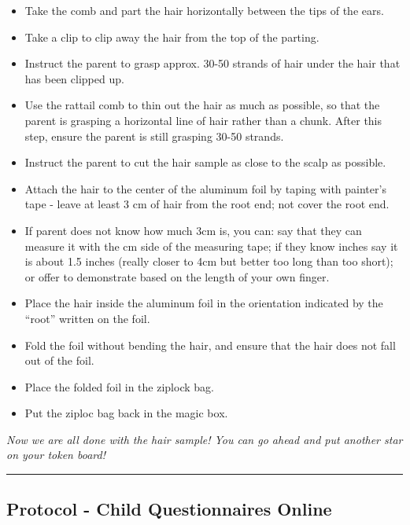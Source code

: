 \documentclass[]{book}
\providecommand{\tightlist}{%
  \setlength{\itemsep}{0pt}\setlength{\parskip}{0pt}}
\begin{document}
\begin{itemize}
\tightlist
\item
  Take the comb and part the hair horizontally between the tips of the ears.
\item
  Take a clip to clip away the hair from the top of the parting.
\item
  Instruct the parent to grasp approx. 30-50 strands of hair under the hair that has been clipped up.
\item
  Use the rattail comb to thin out the hair as much as possible, so that the parent is grasping a horizontal line of hair rather than a chunk. After this step, ensure the parent is still grasping 30-50 strands.
\item
  Instruct the parent to cut the hair sample as close to the scalp as possible.
\item
  Attach the hair to the center of the aluminum foil by taping with painter's tape - leave at least 3 cm of hair from the root end; not cover the root end.
\item
  If parent does not know how much 3cm is, you can: say that they can measure it with the cm side of the measuring tape; if they know inches say it is about 1.5 inches (really closer to 4cm but better too long than too short); or offer to demonstrate based on the length of your own finger.
\item
  Place the hair inside the aluminum foil in the orientation indicated by the ``root'' written on the foil.
\item
  Fold the foil without bending the hair, and ensure that the hair does not fall out of the foil.
\item
  Place the folded foil in the ziplock bag.
\item
  Put the ziploc bag back in the magic box.
\end{itemize}

\emph{Now we are all done with the hair sample! You can go ahead and put another star on your token board!}

\begin{center}\rule{0.5\linewidth}{0.5pt}\end{center}

\hypertarget{protocol---child-questionnaires-online}{%
\subsection{Protocol - Child Questionnaires Online}\label{protocol---child-questionnaires-online}}
\end{document}
